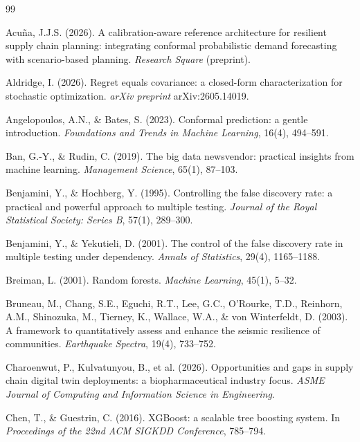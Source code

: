 \documentclass[12pt,a4paper]{article}
\begin{document}
\begin{thebibliography}{99}

 Acu\~na, J.J.S. (2026). A calibration-aware reference architecture for resilient supply chain planning: integrating conformal probabilistic demand forecasting with scenario-based planning. \textit{Research Square} (preprint).

 Aldridge, I. (2026). Regret equals covariance: a closed-form characterization for stochastic optimization. \textit{arXiv preprint} arXiv:2605.14019.

 Angelopoulos, A.N., \& Bates, S. (2023). Conformal prediction: a gentle introduction. \textit{Foundations and Trends in Machine Learning}, 16(4), 494--591.

 Ban, G.-Y., \& Rudin, C. (2019). The big data newsvendor: practical insights from machine learning. \textit{Management Science}, 65(1), 87--103.

 Benjamini, Y., \& Hochberg, Y. (1995). Controlling the false discovery rate: a practical and powerful approach to multiple testing. \textit{Journal of the Royal Statistical Society: Series B}, 57(1), 289--300.

 Benjamini, Y., \& Yekutieli, D. (2001). The control of the false discovery rate in multiple testing under dependency. \textit{Annals of Statistics}, 29(4), 1165--1188.

 Breiman, L. (2001). Random forests. \textit{Machine Learning}, 45(1), 5--32.

 Bruneau, M., Chang, S.E., Eguchi, R.T., Lee, G.C., O'Rourke, T.D., Reinhorn, A.M., Shinozuka, M., Tierney, K., Wallace, W.A., \& von Winterfeldt, D. (2003). A framework to quantitatively assess and enhance the seismic resilience of communities. \textit{Earthquake Spectra}, 19(4), 733--752.

 Charoenwut, P., Kulvatunyou, B., et al. (2026). Opportunities and gaps in supply chain digital twin deployments: a biopharmaceutical industry focus. \textit{ASME Journal of Computing and Information Science in Engineering}.

 Chen, T., \& Guestrin, C. (2016). XGBoost: a scalable tree boosting system. In \textit{Proceedings of the 22nd ACM SIGKDD Conference}, 785--794.


\end{thebibliography}
\end{document}
